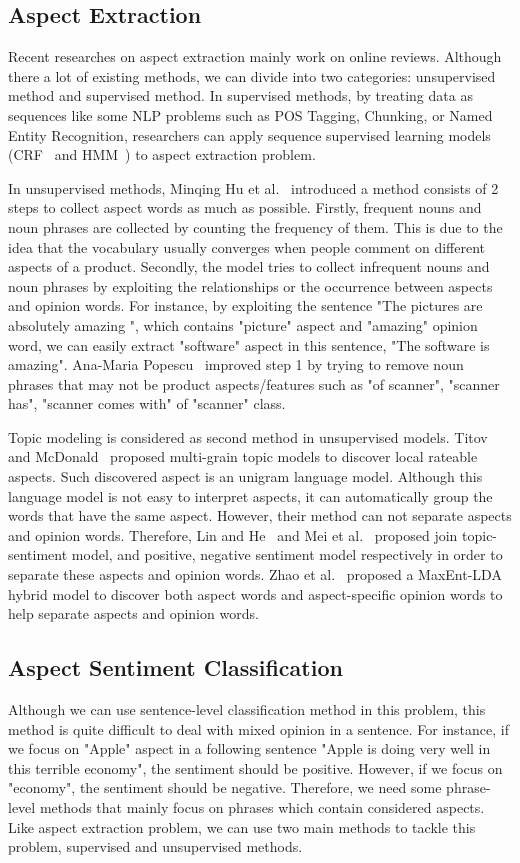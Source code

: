 \documentclass{article}
\begin{document}
\subsection{Aspect Extraction}
Recent researches on aspect extraction mainly work on online reviews. Although there a lot of existing methods, we can divide into two categories: unsupervised method and supervised method. 
In supervised methods, by treating data as sequences like some NLP problems such as POS Tagging, Chunking, or Named Entity Recognition, researchers can apply sequence supervised learning models (CRF~\cite{33,52} and HMM~\cite{22,34,35}) to aspect extraction problem.

In unsupervised methods, Minqing Hu et al.~\cite{Hu:2004:MSC:1014052.1014073}  introduced a method consists of 2 steps to collect aspect words as much as possible. 
Firstly, frequent nouns and noun phrases are collected by counting the frequency of them.
This is due to the idea that the vocabulary usually converges when people comment on different aspects of a product.
Secondly, the model tries to collect infrequent nouns and noun phrases by exploiting the relationships or the occurrence between aspects and opinion words.
For instance, by exploiting the sentence "The pictures are absolutely amazing	", which contains "picture" aspect and "amazing" opinion word, we can easily extract "software" aspect in this sentence, "The software is amazing".
Ana-Maria Popescu~\cite{83} improved step 1 by trying to remove noun phrases that may not be product aspects/features such as "of scanner", "scanner has", "scanner comes with" of "scanner" class.

Topic modeling is considered as second method in unsupervised models.
Titov and McDonald~\cite{99} proposed multi-grain topic models to discover local rateable aspects. 
Such discovered aspect is an unigram language model.
Although this language model is not easy to interpret aspects, it can automatically group the words that have the same aspect.
However, their method can not separate aspects and opinion words.
Therefore, Lin and He~\cite{57} and Mei et al.~\cite{67} proposed join topic-sentiment model, and positive, negative sentiment model respectively in order to separate these aspects and opinion words.
Zhao et al.~\cite{119} proposed a MaxEnt-LDA hybrid model to discover both aspect words and aspect-specific opinion words to help separate aspects and opinion words.

\subsection{Aspect Sentiment Classification}
Although we can use sentence-level classification method in this problem, this method is quite difficult to deal with mixed opinion in a sentence.
For instance, if we focus on "Apple" aspect in a following sentence "Apple is doing very well in this terrible economy", the sentiment should be positive. 
However, if we focus on "economy", the sentiment should be negative.
Therefore, we need some phrase-level methods that mainly focus on phrases which contain considered aspects.
Like aspect extraction problem, we can use two main methods to tackle this problem, supervised and unsupervised methods.
\end{document}
